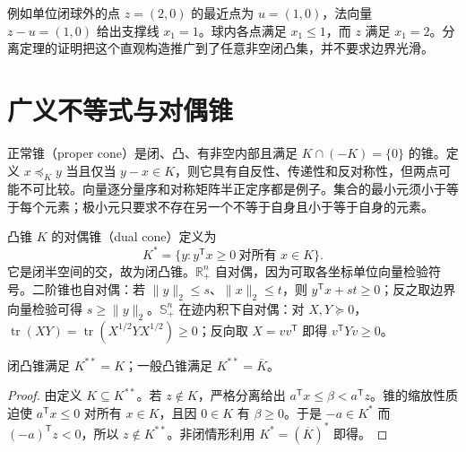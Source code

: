 \documentclass[UTF8,12pt,a4paper,fontset=fandol]{ctexbook}
\begin{document}
例如单位闭球外的点 $z=(2,0)$ 的最近点为 $u=(1,0)$，法向量 $z-u=(1,0)$ 给出支撑线 $x_1=1$。球内各点满足 $x_1\leq1$，而 $z$ 满足 $x_1=2$。分离定理的证明把这个直观构造推广到了任意非空闭凸集，并不要求边界光滑。

\section{广义不等式与对偶锥}

正常锥（proper cone）是闭、凸、有非空内部且满足 $K\cap(-K)=\{0\}$ 的锥。定义 $x\preceq_K y$ 当且仅当 $y-x\in K$，则它具有自反性、传递性和反对称性，但两点可能不可比较。向量逐分量序和对称矩阵半正定序都是例子。集合的最小元须小于等于每个元素；极小元只要求不存在另一个不等于自身且小于等于自身的元素。

凸锥 $K$ 的对偶锥（dual cone）定义为
\begin{equation}
 K^*=\{y:y^{\mathsf T}x\geq0\ \text{对所有 }x\in K\}.
 \label{eq:co-dual-cone}
\end{equation}
它是闭半空间的交，故为闭凸锥。$\mathbb R_+^n$ 自对偶，因为可取各坐标单位向量检验符号。二阶锥也自对偶：若 $\|y\|_2\leq s$、$\|x\|_2\leq t$，则 $y^{\mathsf T}x+st\geq0$；反之取边界向量检验可得 $s\geq\|y\|_2$。$\mathbb S_+^n$ 在迹内积下自对偶：对 $X,Y\succeq0$，$\operatorname{tr}(XY)=\operatorname{tr}(X^{1/2}YX^{1/2})\geq0$；反向取 $X=vv^{\mathsf T}$ 即得 $v^{\mathsf T}Yv\geq0$。

\begin{proposition}
闭凸锥满足 $K^{**}=K$；一般凸锥满足 $K^{**}=\overline K$。
\end{proposition}
\begin{proof}
由定义 $K\subseteq K^{**}$。若 $z\notin K$，严格分离给出 $a^{\mathsf T}x\leq\beta<a^{\mathsf T}z$。锥的缩放性质迫使 $a^{\mathsf T}x\leq0$ 对所有 $x\in K$，且因 $0\in K$ 有 $\beta\geq0$。于是 $-a\in K^*$ 而 $(-a)^{\mathsf T}z<0$，所以 $z\notin K^{**}$。非闭情形利用 $K^*=(\overline K)^*$ 即得。
\end{proof}
\end{document}
